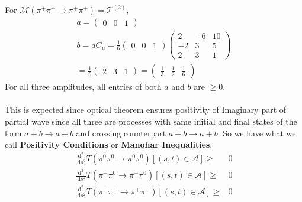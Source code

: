 ﻿\documentclass[12pt,a4paper]{article}
\begin{document}
For $\mathcal{M}\left(\pi^{+} \pi^{+} \rightarrow \pi^{+} \pi^{+}\right)=\mathcal{T}^{(2)}$,
$$
\begin{array}{l}
a=\left(\begin{array}{lll}
0 & 0 & 1
\end{array}\right) \\
b=a C_{u}=\frac{1}{6}\left(\begin{array}{lll}
0 & 0 & 1
\end{array}\right)\left(\begin{array}{ccc}
2 & -6 & 10 \\
-2 & 3 & 5 \\
2 & 3 & 1
\end{array}\right) \\
=\frac{1}{6}\left(\begin{array}{lll}
2 & 3 & 1
\end{array}\right) =\left(\begin{array}{lll}
\frac{1}{3} & \frac{1}{2} & \frac{1}{6}
\end{array}\right) 
\end{array}
$$
For all three amplitudes, all entries of both $a$ and $b$ are $\geq 0$. \\\\
This is expected since optical theorem ensures positivity of Imaginary part of partial wave since all three are processes with same initial and final states of the form $a+b \rightarrow a+b$ and crossing counterpart $a+\bar b \rightarrow a+\bar b$. So we have what we call \textbf{Positivity Conditions} or \textbf{Manohar Inequalities},
$$
\begin{aligned}
\frac{\mathrm{d}^{2}}{\mathrm{~d} s^{2}} T\left(\pi^{0} \pi^{0} \rightarrow \pi^{0} \pi^{0}\right)[(s, t) \in \mathcal{A}] \geq &0\\
\frac{\mathrm{d}^{2}}{\mathrm{~d} s^{2}} T\left(\pi^{+} \pi^{0} \rightarrow \pi^{+} \pi^{0}\right)[(s, t) \in \mathcal{A}] \geq &0 \\
\frac{\mathrm{d}^{2}}{\mathrm{~d} s^{2}} T\left(\pi^{+} \pi^{+} \rightarrow \pi^{+} \pi^{+}\right)[(s, t) \in \mathcal{A}] \geq &0
\end{aligned}
$$
\end{document}
